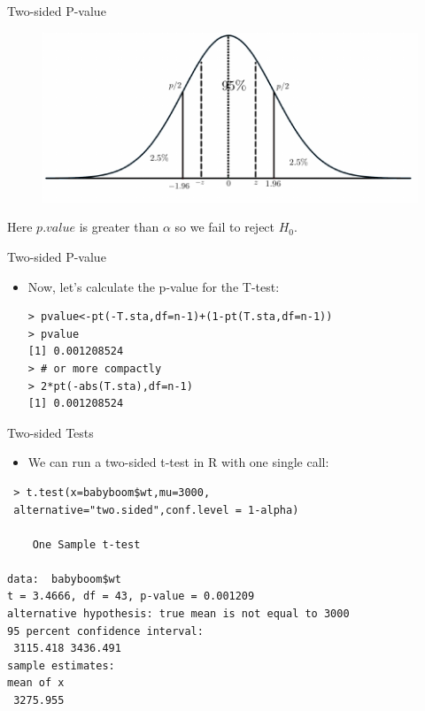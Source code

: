 \documentclass[handout]{beamer}
\begin{document}
\begin{frame}{Two-sided P-value}

 
 
  \begin{figure}[h!]
	\centering
	\includegraphics[scale=0.8]{pics/twosidepval_fail.pdf}
\end{figure}

Here $p.value$ is greater than $\alpha$ so we fail to reject $H_0$.




\end{frame}


\begin{frame}[fragile]{Two-sided P-value}
\scriptsize{
\begin{itemize}

\item Now, let's calculate the p-value for the T-test:

\begin{verbatim}
> pvalue<-pt(-T.sta,df=n-1)+(1-pt(T.sta,df=n-1))
> pvalue
[1] 0.001208524
> # or more compactly
> 2*pt(-abs(T.sta),df=n-1)
[1] 0.001208524
\end{verbatim}


\end{itemize}

} 
\end{frame}


\begin{frame}[fragile]{Two-sided Tests}
\scriptsize{
\begin{itemize}

\item We can run a two-sided t-test in R with one single call:
\end{itemize}

\begin{verbatim}
 > t.test(x=babyboom$wt,mu=3000,
 alternative="two.sided",conf.level = 1-alpha)

	One Sample t-test

data:  babyboom$wt
t = 3.4666, df = 43, p-value = 0.001209
alternative hypothesis: true mean is not equal to 3000
95 percent confidence interval:
 3115.418 3436.491
sample estimates:
mean of x 
 3275.955 
\end{verbatim}



} 
\end{frame}
\end{document}
